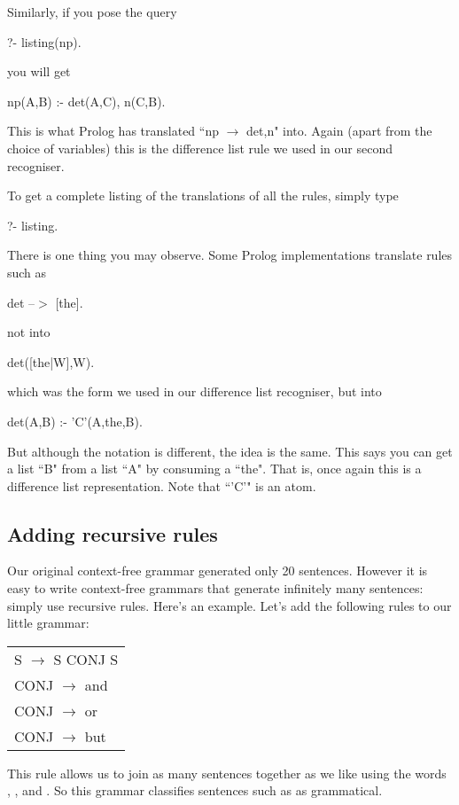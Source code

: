 Similarly, if you pose the query
\begin{LPNcodedisplay}
?- listing(np).
\end{LPNcodedisplay}
you will get
\begin{LPNcodedisplay}
np(A,B) :-
    det(A,C),
    n(C,B).
\end{LPNcodedisplay}
This is what Prolog has translated ``np $\rightarrow$ det,n" into. Again
(apart from the choice of variables) this is  the
difference list rule we used in our second recogniser.

To get a complete listing of the translations of all the rules, simply
type
\begin{LPNcodedisplay}
?- listing.
\end{LPNcodedisplay}
There is one thing you may observe. Some Prolog implementations
translate rules such as
\begin{LPNcodedisplay}
det --$>$ [the].
\end{LPNcodedisplay}
not into
\begin{LPNcodedisplay}
det([the|W],W).
\end{LPNcodedisplay}
which was the form we used in our difference list recogniser, but into
\begin{LPNcodedisplay}
det(A,B) :-
    'C'(A,the,B).
\end{LPNcodedisplay}
But although the notation is different, the idea is the same.  This
says you can get a list ``B" from a list ``A" by consuming a ``the".
That is, once again this is a difference list representation.  Note
that ``'C'" is an atom. 


\subsection*{Adding recursive rules}\label{SUBSEC.L7.RECURSIVE.RULES}


Our original context-free grammar generated only 20 sentences.
However it is easy to write context-free grammars that generate
infinitely many sentences: simply use recursive rules. Here's
an example. Let's add the following rules to our little grammar:

\begin{center}\begin{tabular}{l}
S $\rightarrow$ S CONJ S\\
CONJ $\rightarrow$ and\\
CONJ $\rightarrow$ or\\
CONJ $\rightarrow$ but
\end{tabular}\end{center}
This rule allows us to join as many sentences together as we like
using the words , , and . So this
grammar classifies sentences such as  as grammatical.

